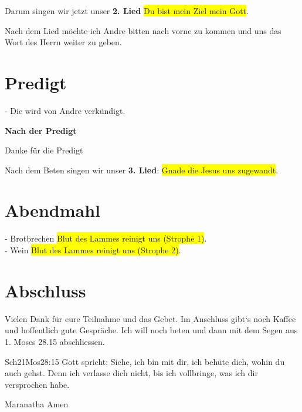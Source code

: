 \documentclass{../inc/mybib}
\begin{document}
\begin{spacing}{1.5}

\end{spacing}
Darum singen wir jetzt unser \textbf{2. Lied} \colorbox{yellow}{Du bist mein Ziel mein Gott}.

Nach dem Lied möchte ich Andre bitten nach vorne zu kommen und uns das Wort des Herrn weiter zu geben.

\section{Predigt}
- Die wird von Andre verkündigt.

\textbf{Nach der Predigt}

Danke für die Predigt

Nach dem Beten singen wir unser \textbf{3. Lied}: \colorbox{yellow}{Gnade die Jesus uns zugewandt}.\\

\section{Abendmahl}
- Brotbrechen
\colorbox{yellow}{Blut des Lammes reinigt uns (Strophe 1)}.\\
- Wein
\colorbox{yellow}{Blut des Lammes reinigt uns (Strophe 2)}.\\

\section{Abschluss}
Vielen Dank für eure Teilnahme und das Gebet. Im Anschluss gibt`s noch Kaffee und hoffentlich gute Gespräche.
Ich will noch beten und dann mit dem Segen aus 1. Moses 28.15 abschliessen.
\begin{bibeltext}{Sch2}{1Mos}{28:15}
Gott spricht: Siehe, ich bin mit dir,
ich behüte dich, wohin du auch gehst.
Denn ich verlasse dich nicht,
bis ich vollbringe, was ich dir versprochen habe.
\end{bibeltext}
Maranatha Amen
\end{document}

